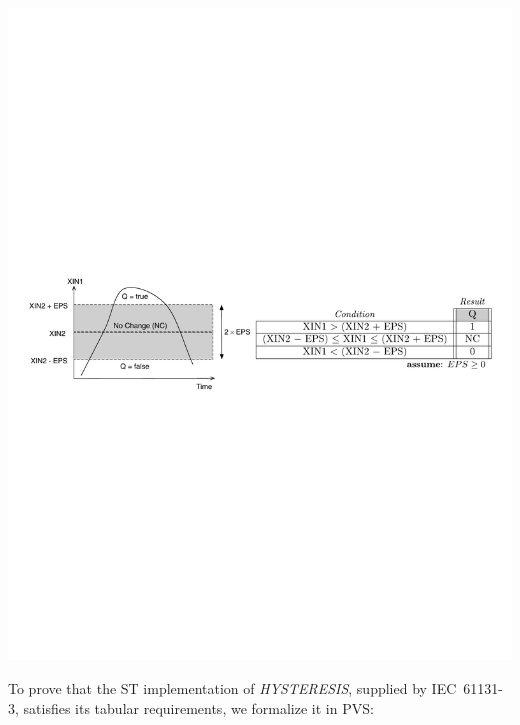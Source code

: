 \documentclass[a0,landscape]{a0poster}
\def\graphspacing{\vspace{.5cm}}
\newcommand{\capcolor}[1]{{\color{Black} #1}}
\newcommand{\var}[1]{{\small \textit{#1}}}
\begin{document}
\begin{multicols}{4}
\begin{center}\graphspacing
\includegraphics[width=\linewidth]{figures/hysteresis/hysteresis_tab_req}
\end{center}\graphspacing

\noindent To prove that the ST implementation of \var{HYSTERESIS}, supplied by IEC~61131-3, satisfies its tabular requirements, we formalize it in PVS:


\end{multicols}
\end{document}
